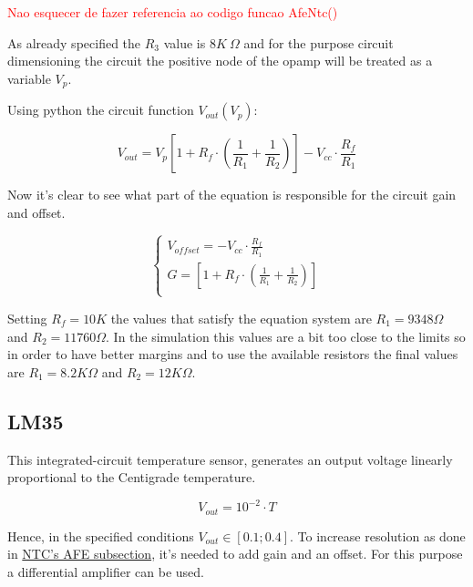 \documentclass[12pt]{article}
\begin{document}
    \textcolor{red}{Nao esquecer de fazer referencia ao codigo funcao AfeNtc()}

    As already specified the $R_3$ value is $8K~\Omega$ and for the purpose circuit dimensioning the circuit 
    the positive node of the opamp will be treated as a variable $V_p$.

    Using python the circuit function $V_{out}(V_p)$:
    
    \begin{equation}
        V_{out} = V_p\left[ 1 + R_f\cdot\left(\frac{1}{R_1} + \frac{1}{R_2}\right) \right] - V_{cc}\cdot\frac{R_f}{R_1}
    \end{equation}

    Now it's clear to see what part of the equation is responsible for the circuit gain and offset.
    
    \begin{equation}
        \begin{cases}
            V_{offset} = - V_{cc}\cdot\frac{R_f}{R_1}\\
            G = \left[ 1 + R_f\cdot\left(\frac{1}{R_1} + \frac{1}{R_2}\right) \right]\\
        \end{cases}
    \end{equation}

    Setting $R_f = 10K$ the values that satisfy the equation system are $R_1 = 9348 \Omega$ and $R_2 = 11760 \Omega$.
    In the simulation this values are a bit too close to the limits so in order to have better margins and to use the available resistors
    the final values are  $R_1 = 8.2K \Omega$ and $R_2 = 12K \Omega$.

    

\subsection{LM35}

    This integrated-circuit temperature sensor, generates an output
    voltage linearly proportional to the Centigrade temperature.

    $$V_{out} = 10^{-2}\cdot T$$

    Hence, in the specified conditions $V_{out}\in[0.1;0.4]$. 
    To increase resolution as done in \hyperref[ AFENTC ]{NTC's AFE subsection},
    it's needed to add gain and an offset. 
    For this purpose a differential amplifier can be used.  
    
\end{document}
